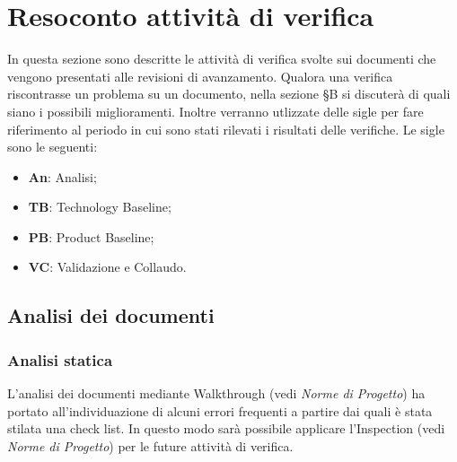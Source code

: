 \section{Resoconto attività di verifica}
In questa sezione sono descritte le attività di verifica svolte sui documenti che vengono presentati alle revisioni di avanzamento. Qualora una verifica riscontrasse un problema su un documento, nella sezione \S B si discuterà di quali siano i possibili miglioramenti.
Inoltre verranno utlizzate delle sigle per fare riferimento al periodo in cui sono stati rilevati i risultati delle verifiche. Le sigle sono le seguenti:
\begin{itemize}
\item \textbf{An}: Analisi;
\item \textbf{TB}: Technology Baseline;
\item \textbf{PB}: Product Baseline;
\item \textbf{VC}: Validazione e Collaudo. 
\end{itemize}

\subsection{Analisi dei documenti}
\subsubsection{Analisi statica}
L'analisi dei documenti mediante Walkthrough (vedi \textit{Norme di Progetto}) ha portato all'individuazione di alcuni errori frequenti a partire dai quali è stata stilata una check list. In questo modo sarà possibile applicare l’Inspection (vedi \textit{Norme di Progetto}) per le future attività di verifica.


